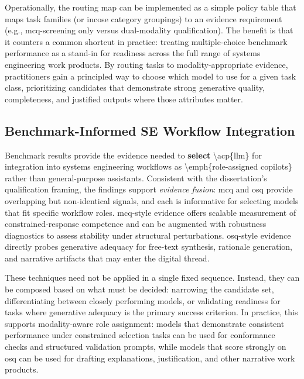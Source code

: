 Operationally, the routing map can be implemented as a simple policy table that maps task families (or \ac{incose} category groupings) to an evidence requirement (e.g., \ac{mcq}-screening only versus dual-modality qualification). The benefit is that it counters a common shortcut in practice: treating multiple-choice benchmark performance as a stand-in for readiness across the full range of systems engineering work products. By routing tasks to modality-appropriate evidence, practitioners gain a principled way to choose which model to use for a given task class, prioritizing candidates that demonstrate strong generative quality, completeness, and justified outputs where those attributes matter. 

\subsection{Benchmark-Informed SE Workflow Integration}

Benchmark results provide the evidence needed to \textbf{select} \textbackslash{}acp\{llm\} for integration into systems engineering workflows as \textbackslash{}emph\{role-assigned copilots\} rather than general-purpose assistants. Consistent with the dissertation’s qualification framing, the findings support \emph{evidence fusion}: \ac{mcq} and \ac{osq} provide overlapping but non-identical signals, and each is informative for selecting models that fit specific workflow roles. \ac{mcq}-style evidence offers scalable measurement of constrained-response competence and can be augmented with robustness diagnostics to assess stability under structural perturbations. \ac{osq}-style evidence directly probes generative adequacy for free-text synthesis, rationale generation, and narrative artifacts that may enter the digital thread.

These techniques need not be applied in a single fixed sequence. Instead, they can be composed based on what must be decided: narrowing the candidate set, differentiating between closely performing models, or validating readiness for tasks where generative adequacy is the primary success criterion. In practice, this supports modality-aware role assignment: models that demonstrate consistent performance under constrained selection tasks can be used for conformance checks and structured validation prompts, while models that score strongly on \ac{osq} can be used for drafting explanations, justification, and other narrative work products. 

